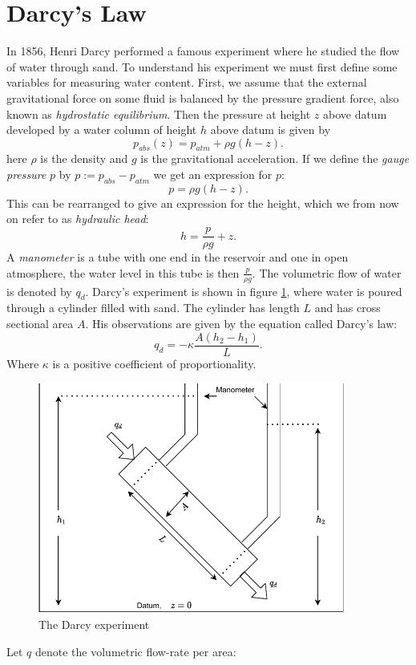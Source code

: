 \documentclass[../Main/main.tex]{subfiles}
\begin{document}
\section{Darcy's Law}
In 1856, Henri Darcy performed a famous experiment where he studied the flow of water through sand. To understand his experiment we must first define some variables for measuring water content. First, we assume that the external gravitational force on some fluid is balanced by the pressure gradient force, also known as \emph{hydrostatic equilibrium}. Then the pressure at height $z$ above datum developed by a water column of height $h$ above datum is given by
\begin{equation*}
p_{abs}(z) = p_{atm} + \rho g(h-z).
\end{equation*}
here $\rho$ is the density and $g$ is the gravitational acceleration.
If we define the \emph{gauge pressure} $p$ by $p := p_{abs}-p_{atm}$ we get an expression for $p$:
\begin{equation*}
p = \rho g(h-z).
\end{equation*}
This can be rearranged to give an expression for the height, which we from now on refer to as \emph{hydraulic head}:
\begin{equation}\label{eq:hydraulic}
h = \frac{p}{\rho g} + z.
\end{equation}
A \emph{manometer} is a tube with one end in the reservoir and one in open atmosphere, the water level in this tube is then $\frac{p}{\rho g}$. The volumetric flow of water is denoted by $q_d$. Darcy's experiment is shown in figure \ref{fig:darcy}, where water is poured through a cylinder filled with sand. The cylinder has length $L$ and has cross sectional area $A$. His observations are given by the equation called Darcy's law:
\begin{equation}
q_d = -\kappa \frac{A(h_2-h_1)}{L}.
\end{equation}
Where $\kappa$ is a positive coefficient of proportionality.
\begin{figure}[h]
\centering
\includegraphics[width=0.9\textwidth]{Darcy experiment.pdf}
\caption{The Darcy experiment}
\label{fig:darcy}
\end{figure}Let $q$ denote the volumetric flow-rate per area:
\end{document}
